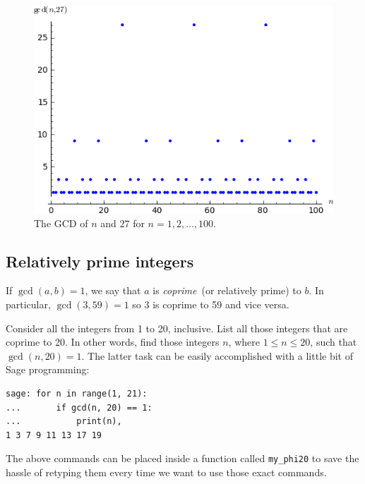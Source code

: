 \begin{figure}[!htbp]
\centering
\includegraphics[scale=1.0]{images/gcd-100}
\caption{The GCD of $n$ and $27$ for $n = 1, 2, \dots, 100$.}
\label{fig:number_theory:gcd_n_27}
\end{figure}



\subsection{Relatively prime integers}

If $\gcd(a,b) = 1$, we say that $a$ is \emph{coprime}~(or relatively
prime) to $b$.  In particular, $\gcd(3, 59) = 1$ so 3 is coprime to 59
and vice versa.

Consider all the integers from 1 to 20, inclusive.  List all those
integers that are coprime to 20.  In other words, find those integers
$n$, where $1 \leq n \leq 20$, such that $\gcd(n,20) = 1$. The latter
task can be easily accomplished with a little bit of Sage programming:

\begin{lstlisting}
sage: for n in range(1, 21):
...       if gcd(n, 20) == 1:
...           print(n),
1 3 7 9 11 13 17 19
\end{lstlisting}

The above commands can be placed inside a function called
\verb!my_phi20! to save the hassle of retyping them every time we want
to use those exact commands.

